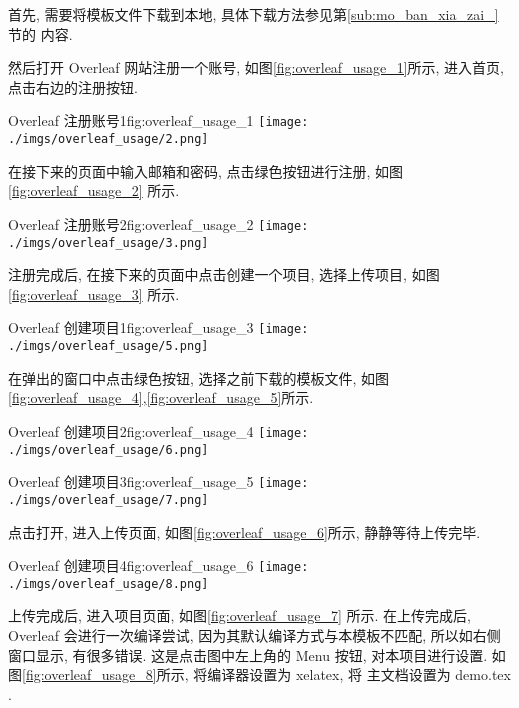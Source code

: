 \documentclass[doctor]{cugthesis}
\begin{document}
首先, 需要将模板文件下载到本地, 具体下载方法参见第\ref{sub:mo_ban_xia_zai_} 节的
内容.

然后打开 Overleaf 网站注册一个账号, 如图\ref{fig:overleaf_usage_1}所示,
进入首页, 点击右边的注册按钮.

\begin{tfig}{Overleaf 注册账号1}{fig:overleaf_usage_1}
    \texttt{[image: ./imgs/overleaf\_usage/2.png]}
\end{tfig}

在接下来的页面中输入邮箱和密码, 点击绿色按钮进行注册,
如图\ref{fig:overleaf_usage_2} 所示.

\begin{tfig}{Overleaf 注册账号2}{fig:overleaf_usage_2}
    \texttt{[image: ./imgs/overleaf\_usage/3.png]}
\end{tfig}

注册完成后, 在接下来的页面中点击创建一个项目, 选择上传项目,
如图\ref{fig:overleaf_usage_3} 所示.

\begin{tfig}{Overleaf  创建项目1}{fig:overleaf_usage_3}
    \texttt{[image: ./imgs/overleaf\_usage/5.png]}
\end{tfig}

在弹出的窗口中点击绿色按钮, 选择之前下载的模板文件,
如图\ref{fig:overleaf_usage_4},\ref{fig:overleaf_usage_5}所示.

\begin{tfig}{Overleaf  创建项目2}{fig:overleaf_usage_4}
    \texttt{[image: ./imgs/overleaf\_usage/6.png]}
\end{tfig}

\begin{tfig}{Overleaf  创建项目3}{fig:overleaf_usage_5}
    \texttt{[image: ./imgs/overleaf\_usage/7.png]}
\end{tfig}

点击打开, 进入上传页面, 如图\ref{fig:overleaf_usage_6}所示, 静静等待上传完毕.

\begin{tfig}{Overleaf  创建项目4}{fig:overleaf_usage_6}
    \texttt{[image: ./imgs/overleaf\_usage/8.png]}
\end{tfig}

上传完成后, 进入项目页面, 如图\ref{fig:overleaf_usage_7} 所示. 在上传完成后,
Overleaf 会进行一次编译尝试, 因为其默认编译方式与本模板不匹配,
所以如右侧窗口显示, 有很多错误. 这是点击图中左上角的 Menu 按钮,
对本项目进行设置. 如图\ref{fig:overleaf_usage_8}所示, 将编译器设置为 xelatex, 将
主文档设置为 demo.tex .
\end{document}
